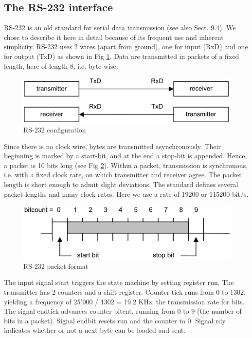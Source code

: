 \subsection{The RS-232 interface}
\label{sub:rs232}
RS-232 is an old standard for serial data transmission (see also Sect. 9.4). We chose to describe it
here in detail because of its frequent use and inherent simplicity. RS-232 uses 2 wires (apart from
ground), one for input (RxD) and one for output (TxD) as shown in Fig \ref{fig:rs232cfg}. Data are
transmitted in packets of a fixed length, here of length 8, i.e. byte-wise.
\begin{figure}[h!]
  \centering
  \includegraphics[width=.9\textwidth]{i/G/b.png}
  \caption{RS-232 configuration}
  \label{fig:rs232cfg}
\end{figure}
Since there is no clock wire,
bytes are transmitted asynchronously. Their beginning is marked by a start-bit, and at the end a
stop-bit is appended. Hence, a packet is 10 bits long (see Fig \ref{fig:rs232pac}). Within a packet,
transmission is synchronous, i.e. with a fixed clock rate, on which transmitter and receiver agree.
The packet length is short enough to admit slight deviations. The standard defines several packet
lengths and many clock rates. Here we use a rate of 19200 or 115200 bit/s.
\begin{figure}[h!]
  \centering
  \includegraphics[width=.96\textwidth]{i/G/c.png}
  \caption{RS-232 packet format}
  \label{fig:rs232pac}
\end{figure}

The input signal start triggers the state machine by setting register run. The transmitter has 2
counters and a shift register. Counter tick runs from 0 to 1302, yielding a frequency of 25’000 / 1302
= 19.2 KHz, the transmission rate for bits. The signal endtick advances counter bitcnt, running from
0 to 9 (the number of bits in a packet). Signal endbit resets run and the counter to 0. Signal rdy
indicates whether or not a next byte can be loaded and sent.

